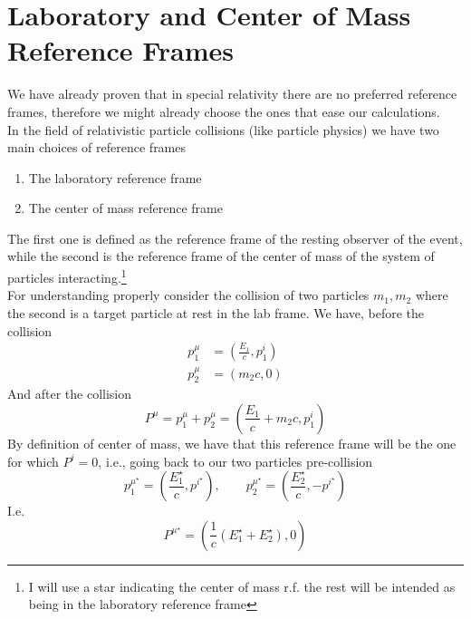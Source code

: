 \documentclass[../admech.tex]{subfiles}
\begin{document}
\section{Laboratory and Center of Mass Reference Frames}
We have already proven that in special relativity there are no preferred reference frames, therefore we might already choose the ones that ease our calculations.\\
In the field of relativistic particle collisions (like particle physics) we have two main choices of reference frames
\begin{enumerate}
\item The laboratory reference frame
\item The center of mass reference frame
\end{enumerate}
The first one is defined as the reference frame of the resting observer of the event, while the second is the reference frame of the center of mass of the system of particles interacting.\footnote{I will use a star indicating the center of mass r.f. the rest will be intended as being in the laboratory reference frame}\\
For understanding properly consider the collision of two particles $m_1,m_2$ where the second is a target particle at rest in the lab frame. We have, before the collision
\begin{equation}
	\begin{aligned}
		p^{\mu}_1&=\left( \frac{E_1}{c},p^i_1 \right)\\
		p^{\mu}_2&=\left( m_2c,0 \right)
	\end{aligned}
	\label{eq:2partcolltarget0}
\end{equation}
And after the collision
\begin{equation}
	P^\mu=p^\mu_1+p^\mu_2=\left( \frac{E_1}{c}+m_2c,p^i_1 \right)
	\label{eq:aftercollision1partcolltarget}
\end{equation}
By definition of center of mass, we have that this reference frame will be the one for which $P^i=0$, i.e., going back to our two particles pre-collision
\begin{equation}
	p^{\mu^\star}_1=\left( \frac{E_1^\star}{c},p^{i^\star} \right),\qquad p^{\mu^\star}_2=\left( \frac{E_2^\star}{c},-p^{i^\star} \right)
	\label{eq:precolcm2prt}
\end{equation}
I.e.
\begin{equation}
	P^{\mu^\star}=\left( \frac{1}{c}\left( E^\star_1+E_2^\star \right),0 \right)
	\label{eq:cmtotmom2partcolltarget}
\end{equation}
\end{document}
